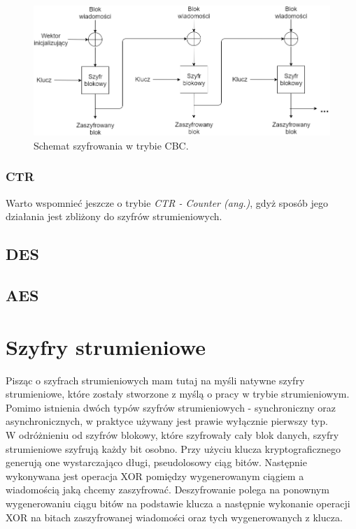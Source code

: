 \begin{figure}
    \centering
	\includegraphics[width=\textwidth]{content/images/cbc-enc-scheme}
    \caption{Schemat szyfrowania w trybie CBC.}
\end{figure}

\subsubsection{CTR}
Warto wspomnieć jeszcze o trybie \textit{CTR - Counter (ang.)}, gdyż sposób jego działania jest zbliżony 
do szyfrów strumieniowych.

\subsection{DES}
\subsection{AES}

\section{Szyfry strumieniowe}
Pisząc o szyfrach strumieniowych mam tutaj na myśli natywne szyfry strumieniowe, które zostały stworzone z myślą o pracy w trybie strumieniowym. 
Pomimo istnienia dwóch typów szyfrów strumieniowych - synchroniczny oraz asynchronicznych, w praktyce używany jest prawie wyłącznie pierwszy typ. \\
W odróżnieniu od szyfrów blokowy, które szyfrowały cały blok danych, szyfry strumieniowe szyfrują każdy bit osobno. 
Przy użyciu klucza kryptograficznego generują one wystarczająco długi, pseudolosowy ciąg bitów. 
Następnie wykonywana jest operacja XOR pomiędzy wygenerowanym ciągiem a wiadomością jaką chcemy zaszyfrować. 
Deszyfrowanie polega na ponownym wygenerowaniu ciągu bitów na podstawie klucza a następnie wykonanie operacji XOR na bitach zaszyfrowanej wiadomości oraz tych wygenerowanych z klucza.

